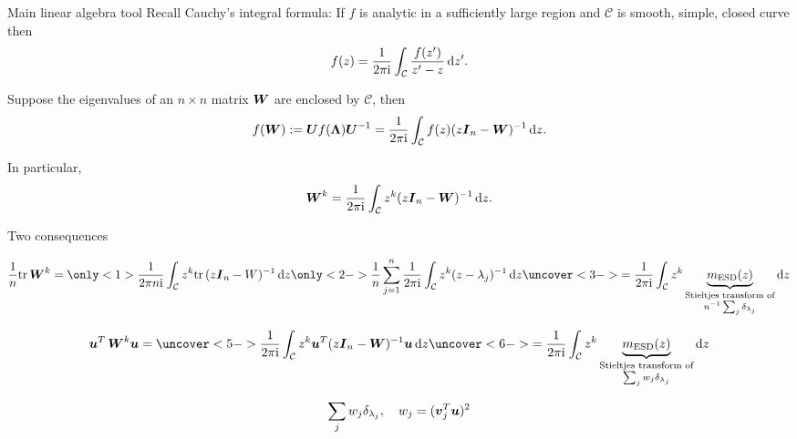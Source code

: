 \documentclass[9pt,aspectratio=169]{beamer}
\begin{document}
\begin{frame}{Main linear algebra tool}
Recall Cauchy's integral formula:  If $f$ is analytic in a sufficiently large region and $\mathcal C$ is smooth, simple, closed curve then
\begin{align*}
    f(z) = \frac{1}{2 \pi \mathrm i} \int_{\mathcal C} \frac{f(z')}{z' - z} \mathop{}\!\mathrm{d} z'.
\end{align*}
\pause

Suppose the eigenvalues of an $n \times n$ matrix ${\boldsymbol W}$ are enclosed by $\mathcal C$, then
\begin{align*}
    f({\boldsymbol W}) := {\boldsymbol U} f(\boldsymbol \Lambda) {\boldsymbol U}^{-1} = \frac{1}{2 \pi \mathrm i} \int_{\mathcal C} f(z)( z {\boldsymbol I}_n - {\boldsymbol W})^{-1} \mathop{}\!\mathrm{d} z.
\end{align*}

\pause

In particular,
\begin{align*}
    {\boldsymbol W}^k = \frac{1}{2 \pi \mathrm i} \int_{\mathcal C} z^k(z {\boldsymbol I}_n - {\boldsymbol W})^{-1} \mathop{}\!\mathrm{d} z.
\end{align*}

\end{frame}

\begin{frame}{Two consequences}

\begin{align*}
    \frac{1}{n}\mathrm{tr}\,\WW^k = \only<1>{ \frac{1}{2 \pi n \mathrm i} \int_{\mathcal C} z^k  \mathrm{tr}\, (z\II_n - W)^{-1} \dif z}\only<2->{\frac{1}{n} \sum_{j=1}^n \frac{1}{2 \pi \mathrm i} \int_{\mathcal C} z^k(z - \lambda_j)^{-1} \dif z}   \uncover<3->{= \frac{1}{2 \pi \mathrm i} \int_{\mathcal C} z^k \underbrace{m_{\mathrm{ESD}}(z)}_{\substack{\text{Stieltjes transform of} \\ n^{-1} \sum_j \delta_{\lambda_j} }} \dif z}
\end{align*}

\pause
\pause
\pause

\begin{align*}
    \uu^T\,\WW^k \uu = \uncover<5->{ \frac{1}{2 \pi \mathrm i} \int_{\mathcal C} z^k\uu^T(z \II_n - \WW)^{-1}\uu \dif z}  \uncover<6->{ = \frac{1}{2 \pi \mathrm i} \int_{\mathcal C} z^k \underbrace{m_{\mathrm{ESD}}(z)}_{\substack{\text{Stieltjes transform of} \\  \sum_j w_j \delta_{\lambda_j} }} \dif z}
\end{align*}

\pause \pause

\begin{align*}
    \sum_j w_j \delta_{\lambda_j}, \quad  w_j = ({\boldsymbol v}_j^T {\boldsymbol u})^2
\end{align*}

\end{frame}
\end{document}
